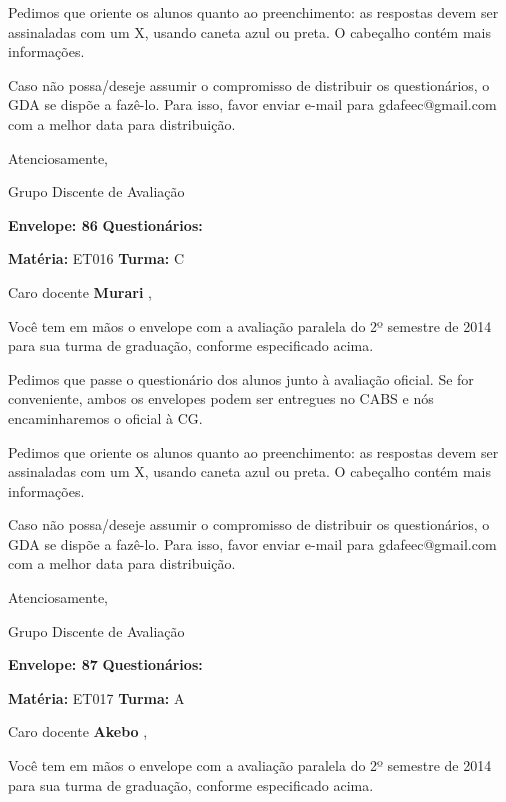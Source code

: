 \documentclass[a5paper]{letter}
\begin{document}
Pedimos que oriente os alunos quanto ao preenchimento: as respostas devem ser assinaladas com um X, usando caneta azul ou preta. O cabeçalho contém mais informações.

	Caso não possa/deseje assumir o compromisso de distribuir os questionários, o GDA se dispõe a fazê-lo. Para isso, favor enviar e-mail para gdafeec@gmail.com com a melhor data para distribuição.


Atenciosamente, 

Grupo Discente de Avaliação

\vspace{0.5cm}

{\bf Envelope: 86 }		\hfill	{\bf Questionários:} \hspace{2cm}

\newpage
\thispagestyle{empty}

\hfill {\bf Matéria:} ET016 {\bf Turma:} C

Caro docente {\bf Murari }, 

	Você tem em mãos o envelope com a avaliação paralela do 2º semestre de 2014 para sua turma de graduação, conforme especificado acima.

	Pedimos que passe o questionário dos alunos junto à avaliação oficial. Se for conveniente, ambos os envelopes podem ser entregues no CABS e nós encaminharemos o oficial à CG.

Pedimos que oriente os alunos quanto ao preenchimento: as respostas devem ser assinaladas com um X, usando caneta azul ou preta. O cabeçalho contém mais informações.

	Caso não possa/deseje assumir o compromisso de distribuir os questionários, o GDA se dispõe a fazê-lo. Para isso, favor enviar e-mail para gdafeec@gmail.com com a melhor data para distribuição.


Atenciosamente, 

Grupo Discente de Avaliação

\vspace{0.5cm}

{\bf Envelope: 87 }		\hfill	{\bf Questionários:} \hspace{2cm}

\newpage
\thispagestyle{empty}

\hfill {\bf Matéria:} ET017 {\bf Turma:} A

Caro docente {\bf Akebo }, 

	Você tem em mãos o envelope com a avaliação paralela do 2º semestre de 2014 para sua turma de graduação, conforme especificado acima.
\end{document}

